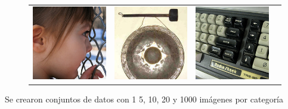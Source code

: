 \documentclass{beamer}
\begin{document}
\begin{frame}[plain]
\begin{figure}
{\begin{tabular}{cccc}
\includegraphics[width = 1.5in]{./images/imagenet/n03000134_789.JPEG} &
\includegraphics[width = 1.5in]{./images/imagenet/n03017168_743.JPEG} &
\includegraphics[width = 1.5in]{./images/imagenet/n03085013_2149.JPEG} \\
\end{tabular}
}
\end{figure}
\vfill
Se crearon conjuntos de datos con 1 5, 10, 20 y 1000 imágenes por categoría
\vfill
\end{frame}
\end{document}
